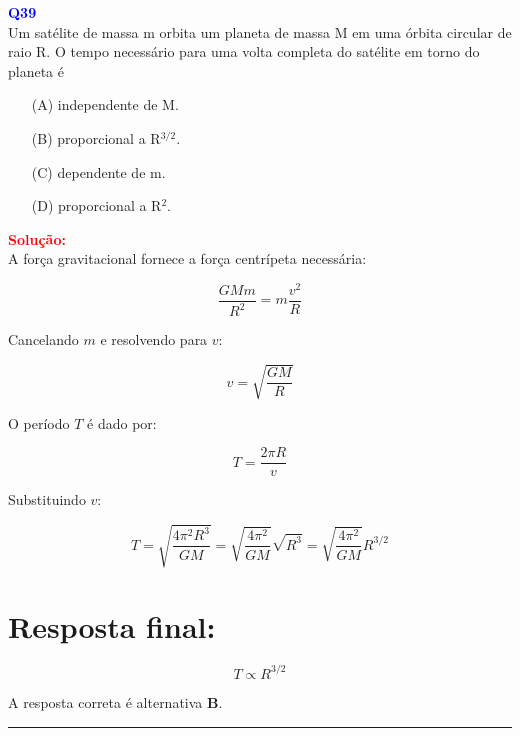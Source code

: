 \documentclass[a4paper,12pt]{article}
\begin{document}
\begin{flushleft}
\textbf{\textcolor{blue}{\Large Q39}}\\
\noindent
Um satélite de massa m orbita um planeta de massa M em
uma órbita circular de raio R. O tempo necessário para uma
volta completa do satélite em torno do planeta é

\begin{itemize}
\item[(A)] independente de M.
\item[(B)] proporcional a R$^{3/2}$.
\item[(C)] dependente de m.
\item[(D)] proporcional a R$^{2}$.
\end{itemize}

\vspace{0.5cm}

\textcolor{red}{\textbf{Solução:}}\\

A força gravitacional fornece a força centrípeta necessária:

\[
\frac{G M m}{R^2} = m \frac{v^2}{R}
\]

Cancelando \(m\) e resolvendo para \(v\):

\[
v = \sqrt{\frac{G M}{R}}
\]

O período \(T\) é dado por:

\[
T = \frac{2\pi R}{v}
\]

Substituindo \(v\):

\[
T =
\sqrt{\frac{4 \pi^{2} R^{3}}{G M}} =\sqrt{\frac{4 \pi^{2}}{G M}}\sqrt{R^{3}} = \sqrt{\frac{4 \pi^{2}}{G M}} R^{3/2}
\]


\section*{Resposta final:}

\[
\boxed{
T \propto R^{3/2}
}
\]


A resposta correta é alternativa \colorbox{green!50}{\textbf{B}}.
\end{flushleft}

\noindent\rule{\linewidth}{0.6pt}\\
\end{document}
